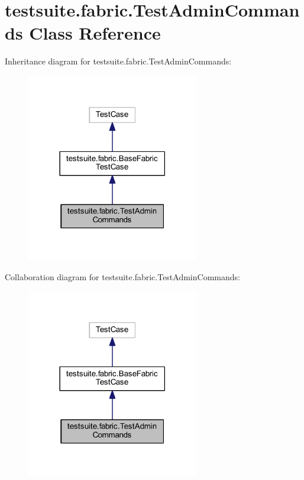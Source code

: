 \hypertarget{classtestsuite_1_1fabric_1_1_test_admin_commands}{}\section{testsuite.\+fabric.\+Test\+Admin\+Commands Class Reference}
\label{classtestsuite_1_1fabric_1_1_test_admin_commands}


Inheritance diagram for testsuite.\+fabric.\+Test\+Admin\+Commands\+:
\nopagebreak
\begin{figure}[H]
\begin{center}
\leavevmode
\includegraphics[width=213pt]{classtestsuite_1_1fabric_1_1_test_admin_commands__inherit__graph}
\end{center}
\end{figure}


Collaboration diagram for testsuite.\+fabric.\+Test\+Admin\+Commands\+:
\nopagebreak
\begin{figure}[H]
\begin{center}
\leavevmode
\includegraphics[width=213pt]{classtestsuite_1_1fabric_1_1_test_admin_commands__coll__graph}
\end{center}
\end{figure}
